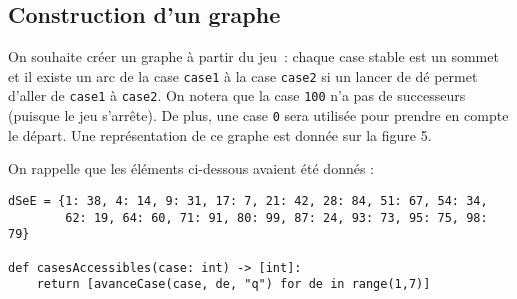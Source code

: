 %	



%	




%	

\subsection*{Construction d'un graphe}

On souhaite créer un graphe à partir du jeu~: chaque case stable est un sommet et il existe un arc de la case \texttt{case1} à la case \texttt{case2} si un lancer de dé permet d'aller de \texttt{case1} à \texttt{case2}. On notera que la case \texttt{100} n'a pas de successeurs (puisque le jeu s'arrête). De plus, une case \texttt{0} sera utilisée pour prendre en compte le départ. Une représentation de ce graphe est donnée sur la figure 5.

On rappelle que les éléments ci-dessous avaient été donnés : 

\begin{lstlisting}
dSeE = {1: 38, 4: 14, 9: 31, 17: 7, 21: 42, 28: 84, 51: 67, 54: 34,
        62: 19, 64: 60, 71: 91, 80: 99, 87: 24, 93: 73, 95: 75, 98: 79}

def casesAccessibles(case: int) -> [int]:
    return [avanceCase(case, de, "q") for de in range(1,7)]
\end{lstlisting}

